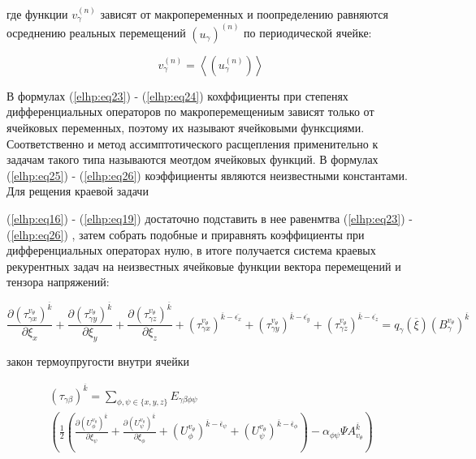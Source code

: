 где функции 
$v_{ \gamma}^{(n)}$ 
зависят от макропеременных и поопределению равняются осреднению реальных перемещений 
$ \left(  u_{ \gamma} \right)^{(n)} $ 
по периодической ячейке:

\begin{equation}
    \label{elhp:eq27}
    v_{ \gamma}^{(n)} = \left< \left( u_{ \gamma}^{(n)} \right)  \right> 
\end{equation}

В формулах 
(\ref{elhp:eq23})
-
(\ref{elhp:eq24})
кохффициенты при степенях дифференциальных операторов по макроперемещениым зависят только от ячейковых переменных, 
поэтому их называют ячейковыми функсциями. Соответственно и метод ассимптотического расщепления применительно к задачам такого типа
называются меотдом ячейковых функций. В формулах 
(\ref{elhp:eq25})
-
(\ref{elhp:eq26})
коэффициенты являются неизвестными константами. Для рещения краевой задачи

(\ref{elhp:eq16})
-
(\ref{elhp:eq19})
достаточно подставить в нее равенмтва 
(\ref{elhp:eq23})
-
(\ref{elhp:eq26})
, затем собрать подобные и приравнять коэффициенты при дифференциальных операторах 
нулю, в итоге получается система краевых рекурентных задач на неизвестных ячейковые функции вектора перемещений и тензора напряжений:

\begin{equation}
    \label{elhp:eq28}
    \frac{\partial \left(  \tau_{ \gamma x}^{v_{\theta}}\right)^{ \overline{k} }}{\partial \xi_x} +
    \frac{\partial \left(  \tau_{ \gamma y}^{v_{\theta}}\right)^{ \overline{k} }}{\partial \xi_y} +
    \frac{\partial \left(  \tau_{ \gamma z}^{v_{\theta}}\right)^{ \overline{k} }}{\partial \xi_z} +
    \left(  \tau_{ \gamma x}^{v_{\theta}}\right)^{ \overline{k} - \overline{\epsilon_x} } +
    \left(  \tau_{ \gamma y}^{v_{\theta}}\right)^{ \overline{k} - \overline{\epsilon_y} } +
    \left(  \tau_{ \gamma z}^{v_{\theta}}\right)^{ \overline{k} - \overline{\epsilon_z} } =
    q_{\gamma} \left( \overline{\xi}  \right) \left( B_{\gamma}^{v_{\theta}} \right)^{ \overline{k} }
\end{equation}

закон термоупругости внутри ячейки

\begin{equation}
    \label{elhp:eq29}
    \begin{gathered}
    \left( \tau_{ \gamma\beta} \right)^{ \overline{k} } =
    \sum_{ \phi,\psi \in \{x,y,z\}} E_{ \gamma\beta\phi\psi}
    \\
    \left( \frac{1}{2} 
        \left( 
            \frac{\partial \left( U_{\phi}^{v_{\theta}}\right)^{ \overline{k} }}{\partial \xi_{\psi}} +
            \frac{\partial \left( U_{\psi}^{v_{\theta}}\right)^{ \overline{k} }}{\partial \xi_{\phi}} +
            \left( U_{\phi}^{v_{\theta}}\right)^{ \overline{k} - \overline{\epsilon}_{\psi}  } +
            \left( U_{\psi}^{v_{\theta}}\right)^{ \overline{k} - \overline{\epsilon}_{\phi}  }
        \right) 
        - \alpha_{\phi\psi} \Psi A_{v_{\theta}}^{ \overline{k} }
    \right) 
    \end{gathered}
\end{equation}

